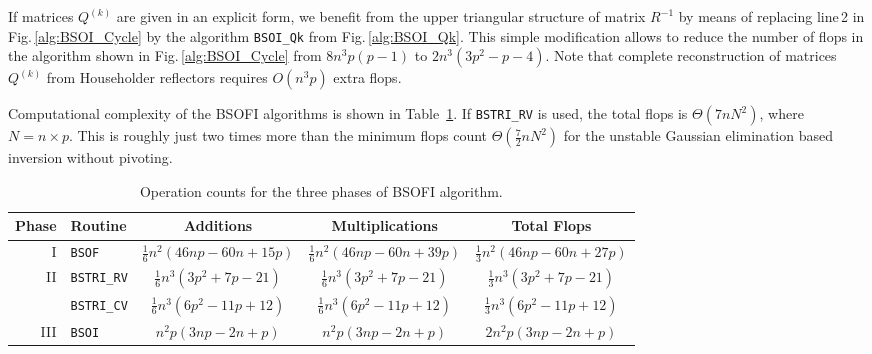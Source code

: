 \documentclass{llncs}
\begin{document}
If matrices $Q^{(k)}$ are given in an explicit form,
we benefit from the upper triangular structure of matrix $R^{-1}$
by means of replacing line\,2 %
in Fig.\,\ref{alg:BSOI_Cycle} 
by the algorithm {\tt BSOI\_Qk} from Fig.\,\ref{alg:BSOI_Qk}.
This simple modification allows to reduce the number of flops 
in the algorithm shown in Fig.\,\ref{alg:BSOI_Cycle}
from $8n^3 p (p - 1)$ to $2 n^3 (3 p^2 - p - 4)$.
Note that complete reconstruction of matrices $Q^{(k)}$ 
from Householder reflectors
requires 
$O(n^3 p)$
extra flops.

{Computational complexity}
of the BSOFI algorithms is shown in Table~\ref{tab:developed_routines_complexity}.
If {\tt BSTRI\_RV} is used, 
the total flops is $\Theta(7 n N^2)$, where $N=n{\times}p$.
This is roughly just two times more than the 
minimum flops count $\Theta(\frac{7}{2} n  N^2)$
for the unstable Gaussian elimination based inversion 
without pivoting.

\begin{table}[t]%
  \caption[]{Operation counts for the three phases of BSOFI algorithm.\footnotemark} 
  \label{tab:developed_routines_complexity}
  \begin{tabular}{r|l|c|c|c}
    \toprule
    Phase & Routine & Additions & Multiplications & Total Flops  \\
    \hline\hline %
    I&{\tt BSOF} & 
    $\frac{1}{6} n^{2} \left(46 n p - 60 n + 15 p\right)$
    & $\frac{1}{6} n^{2} \left(46 n p - 60 n + 39 p\right)$
    & $\frac{1}{3} n^{2} \left(46 n p - 60 n + 27 p\right)$\\
    \hline
    II&{\tt BSTRI\_RV} & 
    $\frac{1}{6} n^3 \left(3 p^{2} + 7 p - 21\right)$
    & $\frac{1}{6} n^3 \left(3 p^{2} + 7 p - 21\right)$
    & $\frac{1}{3} n^3 \left(3 p^{2} + 7 p - 21\right)$\\
    \cline{2-5}
    &{\tt BSTRI\_CV} & 
    $\frac{1}{6} n^3 \left(6 p^{2} - 11 p + 12\right)$
    & $\frac{1}{6} n^3 \left(6 p^{2} - 11 p + 12\right)$
    & $\frac{1}{3} n^3 \left(6 p^{2} - 11 p + 12\right)$\\
    \hline
    III&{\tt BSOI} & 
    $n^{2} p \left(3 n p - 2 n + p\right)$
    & $n^2 p \left(3 n p - 2 n + p\right)$
    & $2 n^2 p \left(3 n p - 2 n + p\right)$\\
    \bottomrule  
  \end{tabular}
\end{table}
\end{document}
